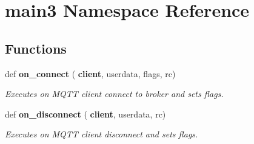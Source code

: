 \section{main3 Namespace Reference}
\label{namespacemain3}
\subsection*{Functions}
\begin{DoxyCompactItemize}
\item 
def \textbf{ on\+\_\+connect} (\textbf{ client}, userdata, flags, rc)
\begin{DoxyCompactList}\small\item\em Executes on M\+Q\+TT client connect to broker and sets flags. \end{DoxyCompactList}\item 
def \textbf{ on\+\_\+disconnect} (\textbf{ client}, userdata, rc)
\begin{DoxyCompactList}\small\item\em Executes on M\+Q\+TT client disconnect and sets flags. \end{DoxyCompactList}\end{DoxyCompactItemize}
